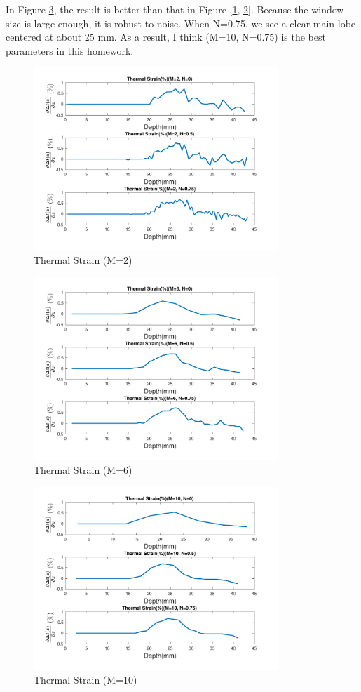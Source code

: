 \documentclass{article}
\begin{document}
In Figure \ref{fig:strain-10}, the result is better than that in Figure [\ref{fig:strain-2}, \ref{fig:strain-6}]. Because the 
window size is large enough, it is robust to noise. When N=0.75, we see a clear main lobe centered at about 25 mm. As a result,
I think (M=10, N=0.75) is the best parameters in this homework.


\begin{figure}[H]
    \centering
    \includegraphics[width=0.82\textwidth]{src/strain_2.pdf}
    \caption{Thermal Strain (M=2)}
    \label{fig:strain-2}
\end{figure}
\begin{figure}[H]
    \centering
    \includegraphics[width=0.82\textwidth]{src/strain_6.pdf}
    \caption{Thermal Strain (M=6)}
    \label{fig:strain-6}
\end{figure}
\begin{figure}[H]
    \centering
    \includegraphics[width=0.82\textwidth]{src/strain_10.pdf}
    \caption{Thermal Strain (M=10)}
    \label{fig:strain-10}
\end{figure}
\end{document}
